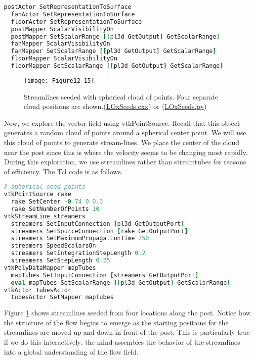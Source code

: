 \begin{lstlisting}[language=TCL, caption={Dicplay the scalar field.}]
  postActor SetRepresentationToSurface
  fanActor SetRepresentationToSurface
  floorActor SetRepresentationToSurface
  postMapper ScalarVisibilityOn
  postMapper SetScalarRange [[pl3d GetOutput] GetScalarRange]
  fanMapper ScalarVisibilityOn
  fanMapper SetScalarRange [[pl3d GetOutput] GetScalarRange]
  floorMapper ScalarVisibilityOn
  floorMapper SetScalarRange [[pl3d GetOutput] GetScalarRange]
\end{lstlisting}

\begin{figure}[!htb]
	\centering
	\texttt{[image: Figure12-15]}
	\caption{Streamlines seeded with spherical cloud of points. Four separate cloud positions are shown.(\href{https://lorensen.github.io/VTKExamples/site/Cxx/VisualizationAlgorithms/LOxSeeds/}{LOxSeeds.cxx}) or (\href{https://lorensen.github.io/VTKExamples/site/Python/VisualizationAlgorithms/LOxSeeds/}{LOxSeeds.py})}
	\label{fig:Figure12-15}
\end{figure}


Now, we explore the vector field using vtkPointSource.
Recall that this object generates a random cloud of points around a spherical center point.
We will use this cloud of points to generate stream-lines.
We place the center of the cloud near the post since this is where the velocity seems to be changing most rapidly.
During this exploration, we use streamlines rather than streamtubes for reasons of efficiency.
The Tcl code is as follows.

\begin{lstlisting}[language=TCL, caption={Explore the vector field using a point source.}]
# spherical seed points
vtkPointSource rake
  rake SetCenter -0.74 0 0.3
  rake SetNumberOfPoints 10
vtkStreamLine streamers
  streamers SetInputConnection [pl3d GetOutputPort]
  streamers SetSourceConnection [rake GetOutputPort]
  streamers SetMaximumPropagationTime 250
  streamers SpeedScalarsOn
  streamers SetIntegrationStepLength 0.2
  streamers SetStepLength 0.25
vtkPolyDataMapper mapTubes
  mapTubes SetInputConnection [streamers GetOutputPort]
  eval mapTubes SetScalarRange [[pl3d GetOutput] GetScalarRange]
vtkActor tubesActor
  tubesActor SetMapper mapTubes
\end{lstlisting}

Figure \ref{fig:Figure12-15} shows streamlines seeded from four locations along the post.
Notice how the structure of the flow begins to emerge as the starting positions for the streamlines are moved up and down in front of the post.
This is particularly true if we do this interactively; the mind assembles the behavior of the streamlines into a global understanding of the flow field.

